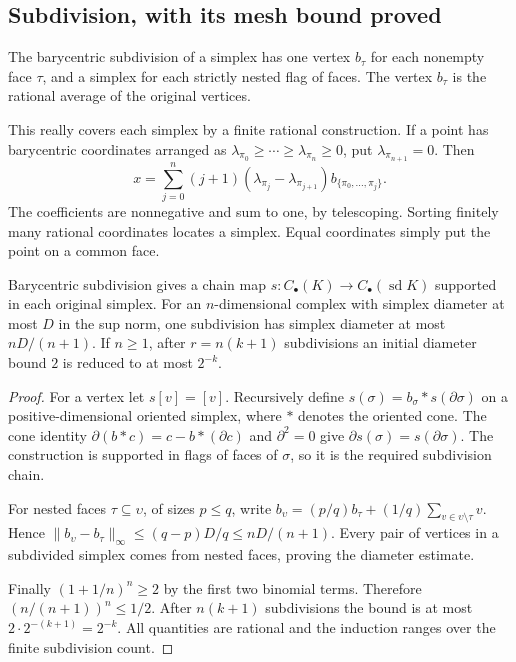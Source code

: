 \subsection{Subdivision, with its mesh bound proved}

The barycentric subdivision of a simplex has one vertex $b_\tau$ for each nonempty face $\tau$, and a simplex for each strictly nested flag of faces. The vertex $b_\tau$ is the rational average of the original vertices.

This really covers each simplex by a finite rational construction. If a point has barycentric coordinates arranged as
$\lambda_{\pi_0}\geq\cdots\geq\lambda_{\pi_n}\geq0$, put $\lambda_{\pi_{n+1}}=0$. Then
\[
 x=\sum_{j=0}^n
 (j+1)(\lambda_{\pi_j}-\lambda_{\pi_{j+1}})
 b_{\{\pi_0,\ldots,\pi_j\}}.
\]
The coefficients are nonnegative and sum to one, by telescoping. Sorting finitely many rational coordinates locates a simplex. Equal coordinates simply put the point on a common face.

\begin{lemma}\label{lem:sphere-subdivision}
Barycentric subdivision gives a chain map $s:C_\bullet(K)\to C_\bullet(\operatorname{sd}K)$ supported in each original simplex. For an $n$-dimensional complex with simplex diameter at most $D$ in the sup norm, one subdivision has simplex diameter at most $nD/(n+1)$. If $n\geq1$, after $r=n(k+1)$ subdivisions an initial diameter bound $2$ is reduced to at most $2^{-k}$.
\end{lemma}
\begin{proof}
For a vertex let $s[v]=[v]$. Recursively define
$s(\sigma)=b_\sigma*s(\partial\sigma)$ on a positive-dimensional oriented simplex, where $*$ denotes the oriented cone. The cone identity
$\partial(b*c)=c-b*(\partial c)$ and $\partial^2=0$ give
$\partial s(\sigma)=s(\partial\sigma)$. The construction is supported in flags of faces of $\sigma$, so it is the required subdivision chain.

For nested faces $\tau\subseteq\upsilon$, of sizes $p\leq q$, write
$b_\upsilon=(p/q)b_\tau+(1/q)\sum_{v\in\upsilon\setminus\tau}v$.
Hence $\|b_\upsilon-b_\tau\|_\infty\leq(q-p)D/q\leq nD/(n+1)$.
Every pair of vertices in a subdivided simplex comes from nested faces, proving the diameter estimate.

Finally $(1+1/n)^n\geq2$ by the first two binomial terms. Therefore $(n/(n+1))^n\leq1/2$. After $n(k+1)$ subdivisions the bound is at most $2\cdot2^{-(k+1)}=2^{-k}$. All quantities are rational and the induction ranges over the finite subdivision count.
\end{proof}

